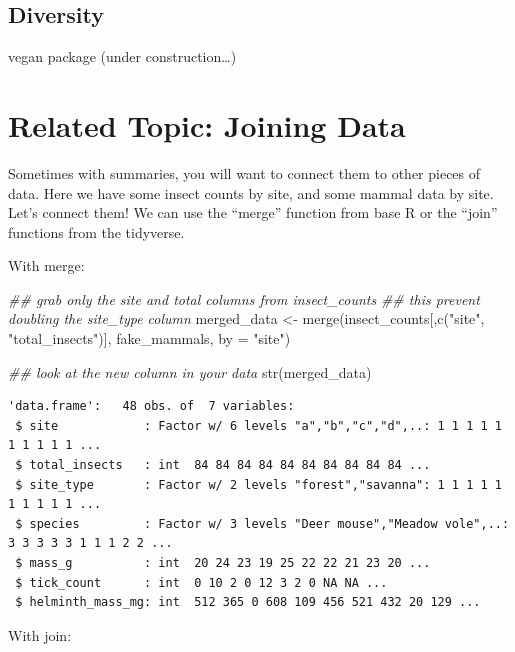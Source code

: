 \documentclass[
  letterpaper,
  DIV=11,
  numbers=noendperiod]{scrreprt}
\newenvironment{Shaded}{\begin{snugshade}}{\end{snugshade}}
\newcommand{\AttributeTok}[1]{\textcolor[rgb]{0.40,0.45,0.13}{#1}}
\newcommand{\DocumentationTok}[1]{\textcolor[rgb]{0.37,0.37,0.37}{\textit{#1}}}
\newcommand{\FunctionTok}[1]{\textcolor[rgb]{0.28,0.35,0.67}{#1}}
\newcommand{\NormalTok}[1]{\textcolor[rgb]{0.00,0.23,0.31}{#1}}
\newcommand{\OtherTok}[1]{\textcolor[rgb]{0.00,0.23,0.31}{#1}}
\newcommand{\StringTok}[1]{\textcolor[rgb]{0.13,0.47,0.30}{#1}}
\begin{document}
\hypertarget{diversity}{%
\subsection{Diversity}\label{diversity}}

vegan package (under construction\ldots)

\hypertarget{related-topic-joining-data}{%
\section{Related Topic: Joining Data}\label{related-topic-joining-data}}

Sometimes with summaries, you will want to connect them to other pieces
of data. Here we have some insect counts by site, and some mammal data
by site. Let's connect them! We can use the ``merge'' function from base
R or the ``join'' functions from the tidyverse.

With merge:

\begin{Shaded}
\begin{Highlighting}[]
\DocumentationTok{\#\# grab only the site and total columns from insect\_counts}
\DocumentationTok{\#\# this prevent doubling the site\_type column}
\NormalTok{merged\_data }\OtherTok{\textless{}{-}} \FunctionTok{merge}\NormalTok{(insect\_counts[,}\FunctionTok{c}\NormalTok{(}\StringTok{"site"}\NormalTok{, }\StringTok{"total\_insects"}\NormalTok{)], fake\_mammals, }\AttributeTok{by =} \StringTok{"site"}\NormalTok{)}

\DocumentationTok{\#\# look at the new column in your data}
\FunctionTok{str}\NormalTok{(merged\_data)}
\end{Highlighting}
\end{Shaded}

\begin{verbatim}
'data.frame':   48 obs. of  7 variables:
 $ site            : Factor w/ 6 levels "a","b","c","d",..: 1 1 1 1 1 1 1 1 1 1 ...
 $ total_insects   : int  84 84 84 84 84 84 84 84 84 84 ...
 $ site_type       : Factor w/ 2 levels "forest","savanna": 1 1 1 1 1 1 1 1 1 1 ...
 $ species         : Factor w/ 3 levels "Deer mouse","Meadow vole",..: 3 3 3 3 3 1 1 1 2 2 ...
 $ mass_g          : int  20 24 23 19 25 22 22 21 23 20 ...
 $ tick_count      : int  0 10 2 0 12 3 2 0 NA NA ...
 $ helminth_mass_mg: int  512 365 0 608 109 456 521 432 20 129 ...
\end{verbatim}

With join:
\end{document}
